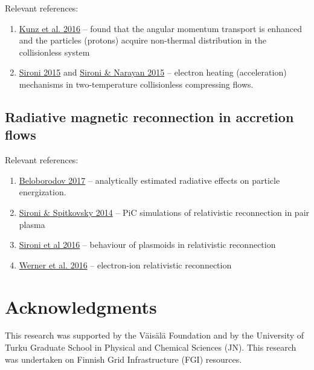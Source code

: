 \documentclass{aa}
\begin{document}
Relevant references: 
\begin{enumerate}
\item \href{http://adsabs.harvard.edu/abs/2016arXiv160807911K}{Kunz et al. 2016} -- found that the angular momentum transport  is enhanced and the particles (protons) acquire non-thermal distribution in the collisionless system
\item \href{http://adsabs.harvard.edu/abs/2015ApJ...800...89S}{Sironi 2015} 
and \href{http://adsabs.harvard.edu/abs/2015ApJ...800...88S}{Sironi \& Narayan 2015} -- electron heating (acceleration) mechanisms in two-temperature collisionless compressing flows.
\end{enumerate}


\subsection{Radiative magnetic reconnection in accretion flows}

Relevant references:
\begin{enumerate}
\item \href{http://adsabs.harvard.edu/abs/2017arXiv170102847B}{Beloborodov 2017} -- analytically estimated radiative effects on particle energization.
\item \href{http://adsabs.harvard.edu/abs/2014ApJ...783L..21S}{Sironi \& Spitkovsky 2014} -- PiC simulations of relativistic reconnection in pair plasma
\item \href{http://adsabs.harvard.edu/abs/2016MNRAS.462...48S}{Sironi et al 2016} -- behaviour of plasmoids in relativistic reconnection 
\item \href{http://adsabs.harvard.edu/abs/2016arXiv161204493W}{Werner et al. 2016} -- electron-ion relativistic reconnection
\end{enumerate}

\section*{Acknowledgments}
This research was supported by the V\"ais\"al\"a Foundation and by the University of Turku Graduate School in Physical and Chemical Sciences (JN).
This research was undertaken on Finnish Grid Infrastructure (FGI) resources.








\clearpage
%
\end{document}
